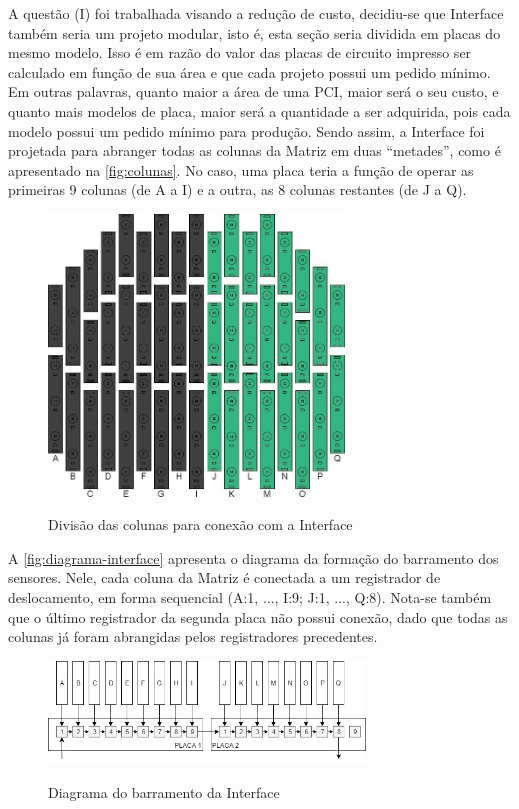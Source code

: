 A questão (I) foi trabalhada visando a redução de custo, decidiu-se que Interface também seria um projeto modular, isto é, esta seção seria dividida em placas do mesmo modelo. Isso é em razão do valor das placas de circuito impresso ser calculado em função de sua área e que cada projeto possui um pedido mínimo. Em outras palavras, quanto maior a área de uma PCI, maior será o seu custo, e quanto mais modelos de placa, maior será a quantidade a ser adquirida, pois cada modelo possui um pedido mínimo para produção. Sendo assim, a Interface foi projetada para abranger todas as colunas da Matriz em duas ``metades'', como é apresentado na \autoref{fig:colunas}. No caso, uma placa teria a função de operar as primeiras 9 colunas (de A a I) e a outra, as 8 colunas restantes (de J a Q).

\begin{figure}[H]
    \centering
    \caption{Divisão das colunas para conexão com a Interface}
    \includegraphics[width=0.7\textwidth]{./dados/figuras/colunas}
    \label{fig:colunas}
\end{figure}

A \autoref{fig:diagrama-interface} apresenta o diagrama da formação do barramento dos sensores. Nele, cada coluna da Matriz é conectada a um registrador de deslocamento, em forma sequencial (A:1, ..., I:9; J:1, ..., Q:8). Nota-se também que o último registrador da segunda placa não possui conexão, dado que todas as colunas já foram abrangidas pelos registradores precedentes.

\begin{figure}[H]
    \centering
    \caption{Diagrama do barramento da Interface}
    \includegraphics[width=0.75\textwidth]{./dados/figuras/interface}
    \label{fig:diagrama-interface}
\end{figure}

